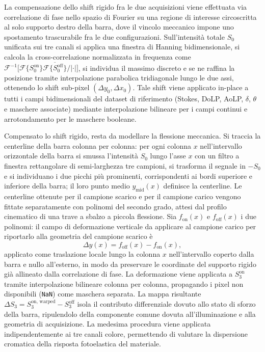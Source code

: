 La compensazione dello shift rigido fra le due acquisizioni viene effettuata via correlazione di fase nello spazio di Fourier su una regione di interesse circoscritta al solo supporto destro della barra, dove il vincolo meccanico impone uno spostamento trascurabile fra le due configurazioni. Sull'intensità totale $S_0$ unificata sui tre canali si applica una finestra di Hanning bidimensionale, si calcola la cross-correlazione normalizzata in frequenza come $\mathcal{F}^{-1}\!\bigl[\mathcal{F}\{S_0^{\mathrm{on}}\}\overline{\mathcal{F}\{S_0^{\mathrm{off}}\}}/|\cdot|\bigr]$, si individua il massimo discreto e se ne raffina la posizione tramite interpolazione parabolica tridiagonale lungo le due assi, ottenendo lo shift sub-pixel $(\Delta y_0, \Delta x_0)$. Tale shift viene applicato in-place a tutti i campi bidimensionali del dataset di riferimento (Stokes, DoLP, AoLP, $\delta$, $\theta$ e maschere associate) mediante interpolazione bilineare per i campi continui e arrotondamento per le maschere booleane.

Compensato lo shift rigido, resta da modellare la flessione meccanica. Si traccia la centerline della barra colonna per colonna: per ogni colonna $x$ nell'intervallo orizzontale della barra si smussa l'intensità $S_0$ lungo l'asse $x$ con un filtro a finestra rettangolare di semi-larghezza tre campioni, si trasforma il segnale in $-S_0$ e si individuano i due picchi più prominenti, corrispondenti ai bordi superiore e inferiore della barra; il loro punto medio $y_{\mathrm{mid}}(x)$ definisce la centerline. Le centerline ottenute per il campione scarico e per il campione carico vengono fittate separatamente con polinomi del secondo grado, attesi dal profilo cinematico di una trave a sbalzo a piccola flessione. Sia $f_{\mathrm{on}}(x)$ e $f_{\mathrm{off}}(x)$ i due polinomi: il campo di deformazione verticale da applicare al campione carico per riportarlo alla geometria del campione scarico è
\begin{equation}
    \Delta y(x) = f_{\mathrm{off}}(x) - f_{\mathrm{on}}(x),
    \label{eq:warp_field}
\end{equation}
applicato come traslazione locale lungo la colonna $x$ nell'intervallo coperto dalla barra e nullo all'esterno, in modo da preservare le coordinate del supporto rigido già allineato dalla correlazione di fase. La deformazione viene applicata a $S_3^{\mathrm{on}}$ tramite interpolazione bilineare colonna per colonna, propagando i pixel non disponibili (\texttt{NaN}) come maschera separata. La mappa risultante $\Delta S_3 = S_3^{\mathrm{on,\,warped}} - S_3^{\mathrm{off}}$ isola il contributo differenziale dovuto allo stato di sforzo della barra, ripulendolo della componente comune dovuta all'illuminazione e alla geometria di acquisizione. La medesima procedura viene applicata indipendentemente ai tre canali colore, permettendo di valutare la dispersione cromatica della risposta fotoelastica del materiale.

